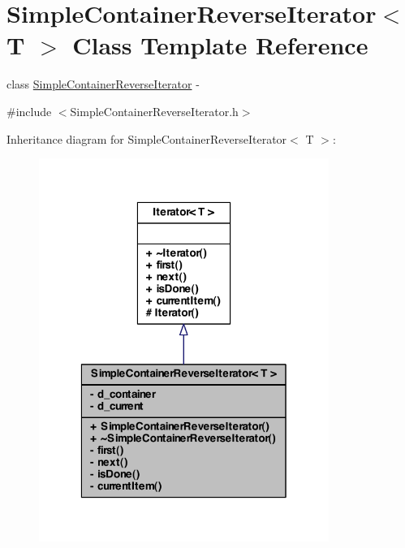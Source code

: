 \hypertarget{class_simple_container_reverse_iterator}{
\section{SimpleContainerReverseIterator$<$ T $>$ Class Template Reference}
\label{class_simple_container_reverse_iterator}
}


class \hyperlink{class_simple_container_reverse_iterator}{SimpleContainerReverseIterator} -\/  




{\ttfamily \#include $<$SimpleContainerReverseIterator.h$>$}



Inheritance diagram for SimpleContainerReverseIterator$<$ T $>$:\nopagebreak
\begin{figure}[H]
\begin{center}
\leavevmode
\includegraphics[width=268pt]{class_simple_container_reverse_iterator__inherit__graph}
\end{center}
\end{figure}


